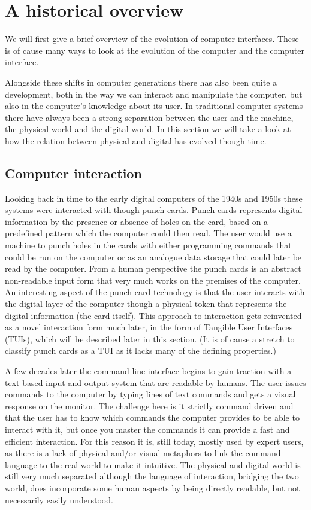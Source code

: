 \section{A historical overview}
We will first give a brief overview of the evolution of computer interfaces.
These is of cause many ways to look at the evolution of the computer and the computer interface. 

Alongside these shifts in computer generations there has also been quite a development, both in the way we can interact and manipulate the computer, but also in the computer's knowledge about its user.
In traditional computer systems there have always been a strong separation between the user and the machine, the physical world and the digital world.
In this section we will take a look at how the relation between physical and digital has evolved though time.

\subsection{Computer interaction}
Looking back in time to the early digital computers of the 1940s and 1950s these systems were interacted with though punch cards.
Punch cards represents digital information by the presence or absence of holes on the card, based on a predefined pattern which the computer could then read.
The user would use a machine to punch holes in the cards with either programming commands that could be run on the computer or as an analogue data storage that could later be read by the computer.
From a human perspective the punch cards is an abstract non-readable input form that very much works on the premises of the computer.
An interesting aspect of the punch card technology is that the user interacts with the digital layer of the computer though a physical token that represents the digital information (the card itself).
This approach to interaction gets reinvented as a novel interaction form much later, in the form of Tangible User Interfaces (TUIs), which will be described later in this section.
(It is of cause a stretch to classify punch cards as a TUI as it lacks many of the defining properties.) 

A few decades later the command-line interface begins to gain traction with a text-based input and output system that are readable by humans.
The user issues commands to the computer by typing lines of text commands and gets a visual response on the monitor.
The challenge here is it strictly command driven and that the user has to know which commands the computer provides to be able to interact with it, but once you master the commands it can provide a fast and efficient interaction.
For this reason it is, still today, mostly used by expert users, as there is a lack of physical and/or visual metaphors to link the command language to the real world to make it intuitive.  
The physical and digital world is still very much separated although the language of interaction, bridging the two world, does incorporate some human aspects by being directly readable, but not necessarily easily understood.

